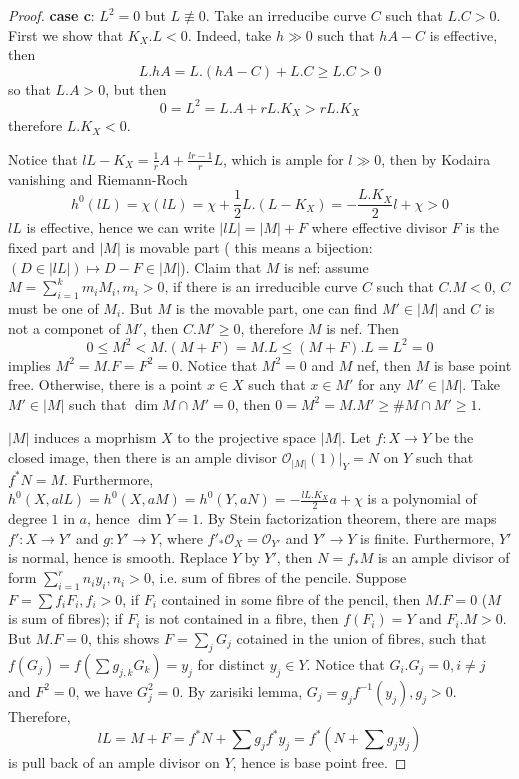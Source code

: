 \documentclass{article}
\begin{document}
\begin{proof}
  \textbf{case c}: $ L^2=0$ but $ L\not\equiv 0 $. Take an irreducibe curve $ C $ such that $ L.C>0 $. First we show that $ K_X.L<0 $. Indeed, take $ h\gg0 $ such that $ hA-C $ is effective, then
  \[ L.hA=L.(hA-C)+L.C\geqslant L.C>0 \]
  so that $ L.A>0 $, but then
  \[ 0=L^2=L.A+rL.K_X>rL.K_X \]
  therefore $ L.K_X<0 $.

  Notice that $ lL-K_X=\frac{1}{r}A+\frac{lr-1}{r}L $, which is ample for $ l\gg 0 $, then by Kodaira vanishing and Riemann-Roch
  \[ h^0(lL)=\chi(lL)=\chi+\frac{1}{2}L.(L-K_X)=-\frac{L.K_X}{2}l+\chi>0 \]
  $ lL $ is effective, hence we can write $ |lL|=|M|+F $ where effective divisor  $ F $ is the fixed part and $ |M| $ is movable part ( this means a bijection: $ (D\in |lL|)\mapsto D-F\in |M| $). Claim that $ M $ is nef: assume $ M=\sum_{i=1}^{k}m_iM_i, m_i>0 $, if there is an irreducible curve $ C $ such that $ C.M<0 $, $ C $ must be one of $ M_i $. But $ M $ is the movable part, one can find $ M'\in |M| $ and $ C $ is not a componet of $ M' $, then $ C.M'\geqslant 0 $, therefore $ M $ is nef. Then
  \[ 0\leqslant M^2<M.(M+F)=M.L\leqslant(M+F).L=L^2=0  \]
  implies $ M^2=M.F=F^2=0 $. Notice that $ M^2=0 $ and $ M $ nef, then $ M $ is base point free. Otherwise, there is a point $ x\in X $ such that $ x\in M'  $ for any $ M'\in |M| $. Take $ M'\in |M| $ such that $ \dim M\cap M'=0 $, then $ 0=M^2=M.M'\geqslant\#M\cap M'\geqslant1 $.

  $ |M| $ induces a moprhism $ X$ to the projective space $ |M| $. Let $f:X\to Y $ be the closed image,  then there is an ample divisor $ \mathcal{O}_{|M|}(1)|_Y=N $ on $ Y $ such that $ f^*N=M $. Furthermore, $ h^0(X,alL)=h^0(X,aM)=h^0(Y,aN)=-\frac{lL.K_X}{2}a+\chi $ is a polynomial of degree $ 1 $ in $ a $, hence $ \dim Y=1 $.  By Stein factorization theorem, there are  maps $ f':X\to Y' $ and $ g:Y'\to Y $, where $ f'_*\mathcal{O}_X=\mathcal{O}_{Y'} $ and $ Y'\to Y $ is finite. Furthermore, $ Y' $ is normal, hence is smooth. Replace $ Y $ by $ Y' $, then $ N=f_*M $ is an ample divisor of form $ \sum_{i=1}^{r}n_iy_i, n_i>0 $, i.e. sum of fibres of the pencile. Suppose $ F=\sum f_iF_i, f_i>0 $, if $ F_i $ contained in some fibre of the pencil, then $ M.F=0 $ ($ M $ is sum of fibres); if $ F_i $ is not contained in a fibre, then $ f(F_i)=Y $ and $ F_i.M>0 $. But $ M.F=0 $, this shows $ F=\sum_{j}G_j $ cotained in the union of fibres, such that $ f(G_j)=f(\sum g_{j,k}G_k)=y_j $ for distinct $ y_j\in Y $. Notice that $ G_i.G_j=0, i\neq j $ and $ F^2=0 $, we have $ G_j^2=0 $. By zarisiki lemma, $ G_j=g_jf^{-1}(y_j), g_j>0 $. Therefore,
  \[ lL=M+F=f^*N+\sum g_jf^*y_j=f^*(N+\sum g_jy_j) \]
  is pull back of an ample divisor on $ Y $, hence is base point free.
\end{proof}
\end{document}
